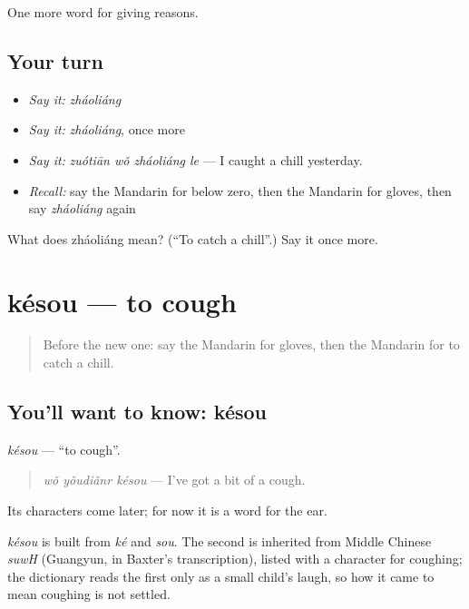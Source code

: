 \begin{grammarlens}[title={What you've built}]
One more word for giving reasons.
\end{grammarlens}

\subsection*{Your turn}
\begin{itemize}
\raggedright
  \item \emph{Say it:} \emph{zháoliáng}
  \item \emph{Say it:} \emph{zháoliáng}, once more
  \item \emph{Say it:} \emph{zuótiān wǒ zháoliáng le} — I caught a chill yesterday.
  \item \emph{Recall:} say the Mandarin for below zero, then the Mandarin for gloves, then say \emph{zháoliáng} again
\end{itemize}

\begin{tcolorbox}[breakable,colback=teal!4,colframe=teal!35!black,title={Before you move on}]
What does zháoliáng mean? (\textquotedblleft{}To catch a chill\textquotedblright{}.) Say it once more.
\end{tcolorbox}
\section[késou]{késou — to cough}

\label{lesson:ZH-C222-kesou}



\begin{quote}
Before the new one: say the Mandarin for gloves, then the Mandarin for to catch a chill.
\end{quote}

\subsection*{You'll want to know: késou}
\emph{késou} — \textquotedblleft{}to cough\textquotedblright{}.

\begin{quote}
\emph{wǒ yǒudiǎnr késou} — I've got a bit of a cough.
\end{quote}

Its characters come later; for now it is a word for the ear.

\begin{cousinweb}
\emph{késou} is built from \emph{ké} and \emph{sou}. The second is inherited from Middle Chinese \emph{suwH} (Guangyun, in Baxter's transcription), listed with a character for coughing; the dictionary reads the first only as a small child's laugh, so how it came to mean coughing is not settled.
\end{cousinweb}

